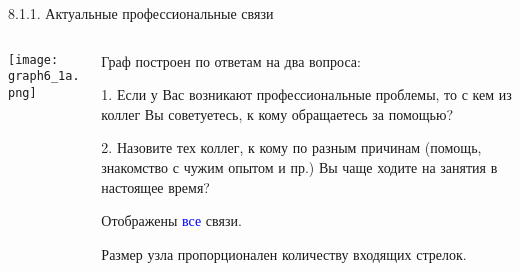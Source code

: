\begin{frame}{8.1.1. Актуальные профессиональные связи}

\begin{columns} 
\begin{column}{0.75\textwidth} 
\centering
          \texttt{[image: graph6\_1a.png]}
\end{column}
\begin{column}{0.25\textwidth} 

\tiny
Граф построен по ответам на два вопроса:
\smallskip

1. Если у Вас возникают профессиональные проблемы, то с кем из коллег Вы советуетесь, к кому обращаетесь за помощью?
\smallskip

2. Назовите тех коллег, к кому по разным причинам (помощь, знакомство с чужим опытом и пр.) Вы чаще ходите на занятия в настоящее время?
\smallskip

Отображены \textcolor{blue}{все} связи. 
\smallskip

Размер узла пропорционален количеству входящих стрелок.

\end{column}
\end{columns}
\end{frame}



